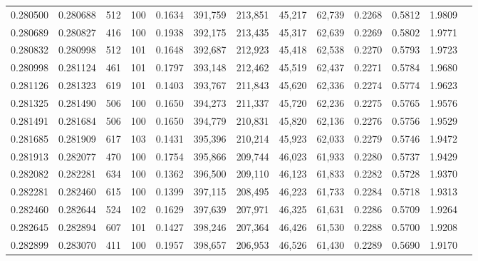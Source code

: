 \begin{tabular}{rrrrrrrrrrrrr}
0.280500 & 0.280688 &   512 & 100 &                                     0.1634 & 391,759 & 213,851 &  45,217 &  62,739 & 0.2268 & 0.5812 & 1.9809 \\
0.280689 & 0.280827 &   416 & 100 &                                     0.1938 & 392,175 & 213,435 &  45,317 &  62,639 & 0.2269 & 0.5802 & 1.9771 \\
0.280832 & 0.280998 &   512 & 101 &                                     0.1648 & 392,687 & 212,923 &  45,418 &  62,538 & 0.2270 & 0.5793 & 1.9723 \\
0.280998 & 0.281124 &   461 & 101 &                                     0.1797 & 393,148 & 212,462 &  45,519 &  62,437 & 0.2271 & 0.5784 & 1.9680 \\
0.281126 & 0.281323 &   619 & 101 &                                     0.1403 & 393,767 & 211,843 &  45,620 &  62,336 & 0.2274 & 0.5774 & 1.9623 \\
0.281325 & 0.281490 &   506 & 100 &                                     0.1650 & 394,273 & 211,337 &  45,720 &  62,236 & 0.2275 & 0.5765 & 1.9576 \\
0.281491 & 0.281684 &   506 & 100 &                                     0.1650 & 394,779 & 210,831 &  45,820 &  62,136 & 0.2276 & 0.5756 & 1.9529 \\
0.281685 & 0.281909 &   617 & 103 &                                     0.1431 & 395,396 & 210,214 &  45,923 &  62,033 & 0.2279 & 0.5746 & 1.9472 \\
0.281913 & 0.282077 &   470 & 100 &                                     0.1754 & 395,866 & 209,744 &  46,023 &  61,933 & 0.2280 & 0.5737 & 1.9429 \\
0.282082 & 0.282281 &   634 & 100 &                                     0.1362 & 396,500 & 209,110 &  46,123 &  61,833 & 0.2282 & 0.5728 & 1.9370 \\
0.282281 & 0.282460 &   615 & 100 &                                     0.1399 & 397,115 & 208,495 &  46,223 &  61,733 & 0.2284 & 0.5718 & 1.9313 \\
0.282460 & 0.282644 &   524 & 102 &                                     0.1629 & 397,639 & 207,971 &  46,325 &  61,631 & 0.2286 & 0.5709 & 1.9264 \\
0.282645 & 0.282894 &   607 & 101 &                                     0.1427 & 398,246 & 207,364 &  46,426 &  61,530 & 0.2288 & 0.5700 & 1.9208 \\
0.282899 & 0.283070 &   411 & 100 &                                     0.1957 & 398,657 & 206,953 &  46,526 &  61,430 & 0.2289 & 0.5690 & 1.9170 \\

\end{tabular}
